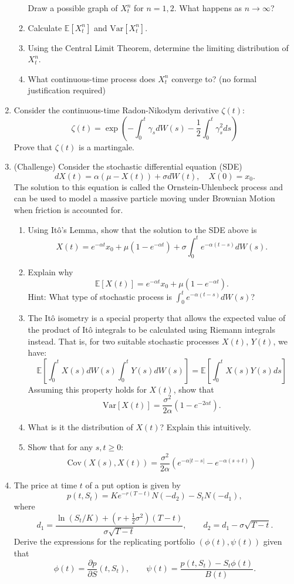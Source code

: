 \documentclass[11pt]{article}
\newcommand{\E}{\mathbb{E}}
\begin{document}
\begin{enumerate}
\begin{enumerate}
				Draw a possible graph of $X^{n}_{t}$ for $n=1,2$. What happens as $n\to\infty$?
				\item Calculate $\E[X^{n}_{t}]$ and $\text{Var}[X^{n}_{t}]$.
				\item Using the Central Limit Theorem, determine the limiting distribution of $X^{n}_{t}$.
				\item What continuous-time process does $X^{n}_{t}$ converge to? (no formal justification required)
			\end{enumerate}
		\item Consider the continuous-time Radon-Nikodym derivative $\zeta(t)$:
		\[	\zeta(t) = \exp\left(-\int_{0}^{t}\gamma_{s}dW(s) -\frac{1}{2} \int_{0}^{t}\gamma_{s}^{2}ds\right)
			\]
		Prove that $\zeta(t)$ is a martingale.
		\item (Challenge) Consider the stochastic differential equation (SDE)
		\[	dX(t) = \alpha(\mu - X(t))+ \sigma dW(t),\quad X(0) = x_{0}.
		\]
		The solution to this equation is called the Ornstein-Uhlenbeck process and can be used to model a massive particle moving under Brownian Motion when friction is accounted for.
		\begin{enumerate}
			\item Using It\^{o}'s Lemma, show that the solution to the SDE above 
			is 
			\[	X(t) = e^{-\alpha t}x_{0} + \mu(1 - e^{-\alpha t}) + \sigma\int_{0}^{t}e^{-\alpha(t - s)}dW(s).
			\]
			\item Explain why 
			\[	\E[X(t)] = e^{-\alpha t}x_{0} + \mu(1 - e^{-\alpha t}).
				\]
			Hint: What type of stochastic process is $\int_{0}^{t}e^{-\alpha(t - s)}dW(s)$?
			\item The It\^{o} isometry is a special property that allows the expected value of the product of It\^{o} integrals to be calculated using Riemann integrals instead. That is, for two suitable stochastic processes $X(t)$, $Y(t)$, we have:
			\[	\E\left[\int_{0}^{t}X(s)dW(s)\int_{0}^{t}Y(s)dW(s)\right]
				 = \E\left[\int_{0}^{t}X(s)Y(s)ds\right]
				\]
			Assuming this property holds for $X(t)$, show that
			\[	\text{Var}[X(t)] = \frac{\sigma^{2}}{2\alpha}(1 - e^{-2\alpha t}).
				\]
			\item What is it the distribution of $X(t)$? Explain this intuitively.
			\item Show that for any $s, t\geq 0$:
			\[	\text{Cov}(X(s), X(t)) = \frac{\sigma^{2}}{2\alpha}(e^{-\alpha|t - s|} - e^{-\alpha(s + t)})
				\]
		\end{enumerate}
	\item The price at time $t$ of a put option is given by 
	\[		p(t, S_t) = Ke^{-r(T - t)}N(-d_{2}) - S_t N(-d_1),
				\]
	where
	\[		d_{1} = \frac{\ln(S_t/ K) + (r + \frac{1}{2}\sigma^2)(T -t)}{\sigma \sqrt{T - t}},\qquad d_{2} = d_{1} - \sigma \sqrt{T - t}.
			\]
	Derive the expressions for the replicating portfolio $(\phi(t), \psi(t))$ given that
	\[		\phi(t) = \frac{\partial p}{\partial S}(t, S_t),\qquad \psi(t)=\frac{p(t, S_t) - S_t \phi(t)}{B(t)}.
			\]
	\end{enumerate}
\end{document}
